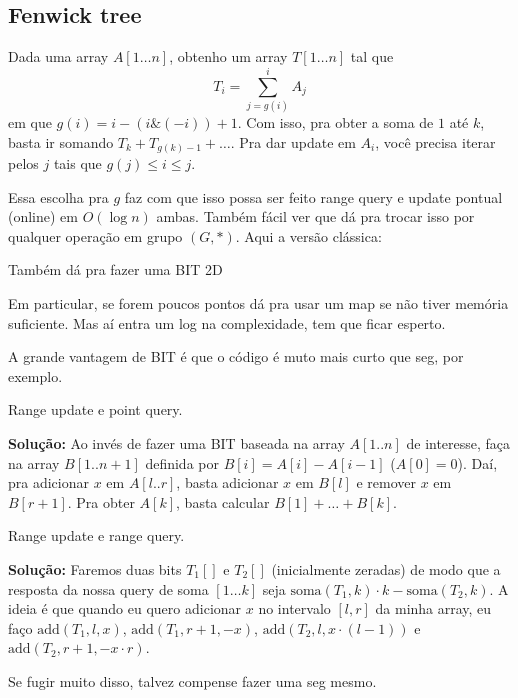 \subsection{Fenwick tree}

Dada uma array $A[1 \dots n]$, obtenho um array $T[1 \dots n]$ tal que
$$T_i = \sum\limits_{j=g(i)}^i A_j$$
em que $g(i) = i - (i \& (-i)) + 1$. Com isso, pra obter a soma de $1$ até $k$, basta
ir somando $T_k + T_{g(k)-1} + \dots$. Pra dar update em $A_i$, você precisa iterar
pelos $j$ tais que $g(j) \leq i \leq j$.

Essa escolha pra $g$ faz com que isso  possa ser feito
range query e update pontual (online) em $O(\log n)$ ambas. 
Também fácil ver que dá pra trocar isso por qualquer operação em grupo $(G, *)$.
Aqui a versão clássica:


Também dá pra fazer uma BIT 2D


Em particular, se forem poucos pontos dá pra usar um map se não tiver memória suficiente.
Mas aí entra um log na complexidade, tem que ficar esperto.

A grande vantagem de BIT é que o código é muto mais curto que seg, por exemplo.

 Range update e point query.

\textbf{Solução:} Ao invés de fazer uma BIT baseada na array $A[1..n]$ de interesse, faça
na array $B[1..n+1]$ definida por $B[i] = A[i] - A[i-1]$ ($A[0]=0$). Daí, pra adicionar $x$ em $A[l..r]$,
basta adicionar $x$ em $B[l]$ e remover $x$ em $B[r+1]$. Pra obter $A[k]$, basta calcular
$B[1] + \dots + B[k]$.

 Range update e range query.

\textbf{Solução:} Faremos duas bits $T_1[]$ e $T_2[]$ (inicialmente zeradas) de modo que a
resposta da nossa query de soma $[1 \dots k]$ seja $\text{soma}(T_1, k) \cdot k - \text{soma}(T_2, k)$.
A ideia é que quando eu quero adicionar $x$ no intervalo $[l, r]$ da minha array, eu faço
$\text{add}(T_1, l, x)$, $\text{add}(T_1, r+1, -x)$, $\text{add}(T_2, l, x \cdot (l-1))$ e 
$\text{add}(T_2, r+1, - x \cdot r)$.

Se fugir muito disso, talvez compense fazer uma seg mesmo.
